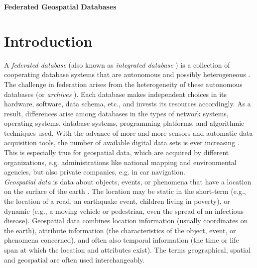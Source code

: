 \documentclass[12pt,a4paper]{report}
\newcommand{\term}{\textit}
\begin{document}
	\begin{titlepage}
		\begin{center}
			\thispagestyle{empty}
			\Large
			\textbf{Federated Geospatial Databases}
		\end{center}
	\end{titlepage}

	{
		\hypersetup{linkcolor=black}
		\tableofcontents
		\thispagestyle{empty}
	}
	
	\chapter{Introduction}
	\label{sec:intro}


	A \term{federated database} (also known as \term{integrated database} 
	\citep{Jian}) is a collection of cooperating database systems that are 
	autonomous and possibly heterogeneous \citep{Sheth}. The challenge in 
	federation arises from the heterogeneity of these autonomous databases (or 
	\term{archives} \citep{Malik}). Each  database  makes  independent choices 
	in its hardware, software, data schema, etc., and invests its resources 
	accordingly. As a result, differences arise among databases in the types of 
	network systems, operating systems, database systems, programming platforms, 
	and algorithmic techniques used. With the advance of more and more sensors 
	and automatic data acquisition tools, the number of available digital data 
	sets is ever increasing \citep{Butenuth}. This is especially true for 
	geospatial data, which are acquired by different organizations, e.g. 
	administrations like national mapping and environmental agencies, but also 
	private companies, e.g. in car navigation.
	\\

	\term{Geospatial data} is data about objects, events, or phenomena that have a location on the surface of the earth \citep{Stock}. The location may be 
	static in the short-term (e.g., the location of a road, an earthquake event, children living in poverty), or dynamic (e.g., a moving vehicle or pedestrian, even the spread of an infectious disease). Geospatial data combines location information (usually coordinates on the earth), attribute information (the characteristics of the object, event, or phenomena concerned), and often also temporal information (the time or life span at which the location and attributes exist). The terms geographical, spatial and geospatial are often used interchangeably.
	\\
\end{document}
